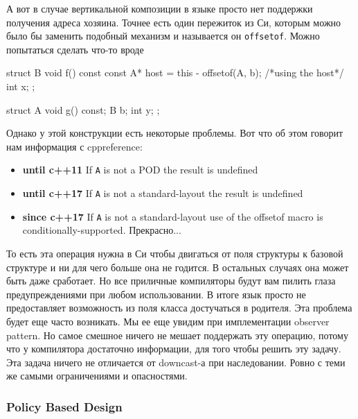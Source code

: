 А вот в случае вертикальной композиции в языке просто нет поддержки получения адреса хозяина.
Точнее есть один пережиток из Си, которым можно было бы заменить подобный механизм и называется он \verb"offsetof".
Можно попытаться сделать что-то вроде
\begin{cppcode}
struct B {
  void f() const {
    const A* host = this - offsetof(A, b);
    /*using the host*/
  }
  int x;
};

struct A {
  void g() const;
  B b;
  int y;
};
\end{cppcode}
Однако у этой конструкции есть некоторые проблемы.
Вот что об этом говорит нам информация с cppreference:
\begin{itemize}
\item \textbf{until c++11} If \verb"A" is not a POD the result is undefined

\item \textbf{until c++17} If \verb"A" is not a standard-layout the result is undefined

\item \textbf{since c++17} If \verb"A" is not a standard-layout use of the offsetof macro is conditionally-supported.
Прекрасно...
\end{itemize}
То есть эта операция нужна в Си чтобы двигаться от поля структуры к базовой структуре и ни для чего больше она не годится.
В остальных случаях она может быть даже сработает.
Но все приличные компиляторы будут вам пилить глаза предупреждениями при любом использовании.
В итоге язык просто не предоставляет возможность из поля класса достучаться в родителя.
Эта проблема будет еще часто возникать.
Мы ее еще увидим при имплементации observer pattern.
Но самое смешное ничего не мешает поддержать эту операцию, потому что у компилятора достаточно информации, для того чтобы решить эту задачу.
Эта задача ничего не отличается от downcast-а при наследовании.
Ровно с теми же самыми ограничениями и опасностями.

\subsubsection{Policy Based Design}

